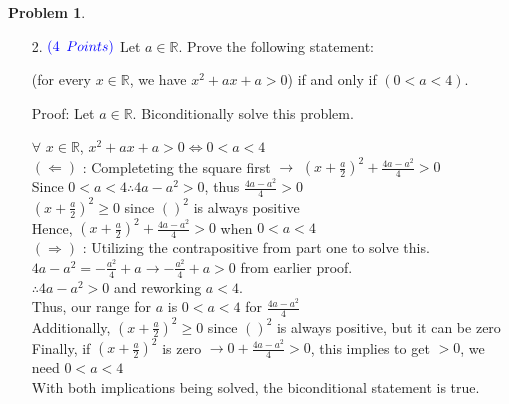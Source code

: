 \documentclass[letterpaper, 12pt]{article}
\theoremstyle{definition}
\newtheorem{pb}{Problem} %
\begin{document}
\begin{spacing}{1.33}
\begin{pb}
\begin{enumerate}
    
    
        \item[2.] $\color{blue}{(4}$ $\color{blue}{Points)}$ Let $a \in \mathbb{R}$. Prove the  following statement:
        \begin{center}
            (for every $x \in \mathbb{R}$, we have $x^2 +ax+a > 0$) if and only if $(0 < a < 4)$.
        \end{center}
    
        Proof: Let $a \in \mathbb{R}$. Biconditionally solve this problem.
        \begin{center}
            $\forall$  $x \in \mathbb{R}$, $x^2 + ax + a > 0 \Longleftrightarrow 0 < a < 4$\\
            \vspace{5mm}
            $(\Longleftarrow)$ : Completeting the square first $\rightarrow$ $(x + \frac{a}{2})^2 + \frac{4a-a^2}{4} > 0$\\
            Since $0 < a < 4 \therefore 4a - a^2 > 0$, thus $\frac{4a-a^2}{4} > 0$\\
            $(x + \frac{a}{2})^2 \geq 0$ since $()^2$ is always positive\\
            Hence, $(x + \frac{a}{2})^2 + \frac{4a-a^2}{4} > 0$ when $0 < a < 4$\\
            \vspace{5mm}
            $(\Longrightarrow)$ : Utilizing the contrapositive from part one to solve this.\\
            $4a - a^2 = -\frac{a^2}{4} + a \longrightarrow -\frac{a^2}{4} + a > 0$ from earlier proof.\\
            $\therefore 4a - a^2 > 0$ and reworking $a < 4$.\\
            Thus, our range for $a$ is $0 < a < 4$ for $\frac{4a - a^2}{4}$\\
            Additionally, $(x + \frac{a}{2})^2 \geq 0$ since $()^2$ is always positive, but it can be zero\\
            Finally, if $(x + \frac{a}{2})^2$ is zero $\longrightarrow 0 + \frac{4a-a^2}{4} >0$, this implies to get $>0$, we need $0<a<4$\\

            \vspace{5mm}
            With both implications being solved, the biconditional statement is true.
        \end{center}
        
    \end{enumerate}
\end{pb}






\end{spacing}
\end{document}
